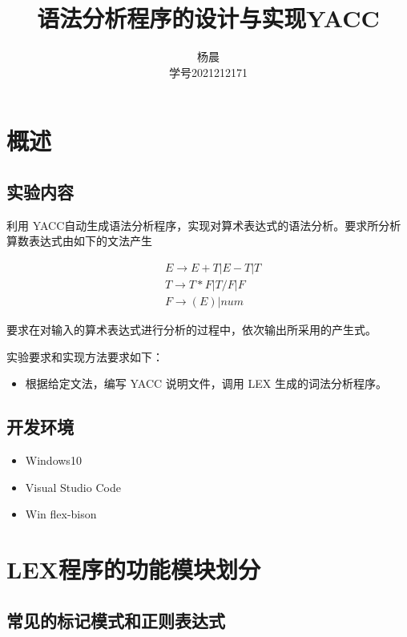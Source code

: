 \documentclass[lang=cn,11pt,a4paper]{elegantpaper}
\title{语法分析程序的设计与实现YACC}
\author{杨晨 \\学号2021212171}
\institute{北京邮电大学 计算机学院}
\date{\zhtoday}
\begin{document}
\maketitle

\section{概述}

\subsection{实验内容}

利用 YACC自动生成语法分析程序，实现对算术表达式的语法分析。要求所分析算数表达式由如下的文法产生

\label{grammar}
$$
\begin{aligned}
& E\rightarrow E+T | E-T | T \\
& T\rightarrow T*F | T/F | F \\
& F\rightarrow (E) | num
\end{aligned}
$$

要求在对输入的算术表达式进行分析的过程中，依次输出所采用的产生式。

实验要求和实现方法要求如下：

\begin{itemize}
    \item 根据给定文法，编写 YACC 说明文件，调用 LEX 生成的词法分析程序。
\end{itemize}

\subsection{开发环境}

\begin{itemize}
    \item Windows10
    \item Visual Studio Code
    \item Win flex-bison
\end{itemize}

\section{LEX程序的功能模块划分}

\subsection{常见的标记模式和正则表达式}
\end{document}
